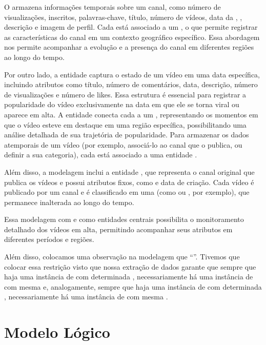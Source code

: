   O  armazena informações temporais sobre um canal, como número de visualizações, inscritos, palavras-chave, título, número de vídeos, data da , , descrição e imagem de perfil. Cada  está associado a um , o que permite registrar as características do canal em um contexto geográfico específico. Essa abordagem nos permite acompanhar a evolução e a presença do canal em diferentes regiões ao longo do tempo.

  Por outro lado, a entidade  captura o estado de um vídeo em uma data específica, incluindo atributos como título, número de comentários, data, descrição, número de visualizações e número de likes. Essa estrutura é essencial para registrar a popularidade do vídeo exclusivamente na data em que ele se torna viral ou aparece em alta. A entidade  conecta cada  a um , representando os momentos em que o vídeo esteve em destaque em uma região específica, possibilitando uma análise detalhada de sua trajetória de popularidade. Para armazenar os dados atemporais de um vídeo (por exemplo, associá-lo ao canal que o publica, ou definir a sua categoria), cada  está associado a uma entidade .

  Além disso, a modelagem inclui a entidade , que representa o canal original que publica os vídeos e possui atributos fixos, como  e data de criação. Cada vídeo é publicado por um canal e é classificado em uma  (como  ou , por exemplo), que permanece inalterada ao longo do tempo.

  Essa modelagem com  e  como entidades centrais possibilita o monitoramento detalhado dos vídeos em alta, permitindo acompanhar seus atributos em diferentes períodos e regiões.

  Além disso, colocamos uma observação na modelagem que ``''. Tivemos que colocar essa restrição visto que nossa extração de dados garante que sempre que haja uma instância de  com determinada , necessariamente há uma instância de  com mesma  e, analogamente, sempre que haja uma instância de  com determinada , necessariamente há uma instância de  com mesma .


\newpage
\section{Modelo Lógico}

